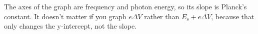 The axes of the graph are frequency and photon energy, so its slope is Planck's constant.
It doesn't matter if you graph $e\Delta V$  rather than $E_s+e\Delta V$, because that only
changes the y-intercept, not the slope.



